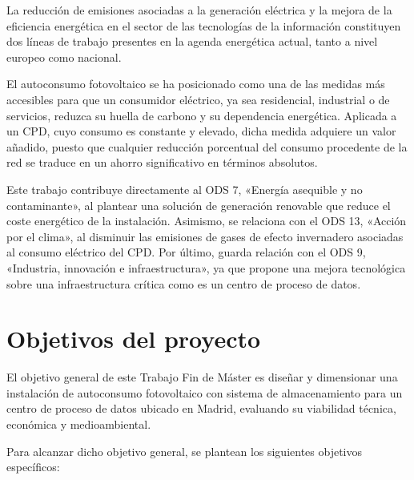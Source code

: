 La reducción de emisiones asociadas a la generación eléctrica y la mejora de la eficiencia energética en el sector de las tecnologías de la información constituyen dos líneas de trabajo presentes en la agenda energética actual, tanto a nivel europeo como nacional.

El autoconsumo fotovoltaico se ha posicionado como una de las medidas más accesibles para que un consumidor eléctrico, ya sea residencial, industrial o de servicios, reduzca su huella de carbono y su dependencia energética. Aplicada a un \ac{CPD}, cuyo consumo es constante y elevado, dicha medida adquiere un valor añadido, puesto que cualquier reducción porcentual del consumo procedente de la red se traduce en un ahorro significativo en términos absolutos.

Este trabajo contribuye directamente al \ac{ODS} 7, «Energía asequible y no contaminante», al plantear una solución de generación renovable que reduce el coste energético de la instalación. Asimismo, se relaciona con el \ac{ODS} 13, «Acción por el clima», al disminuir las emisiones de gases de efecto invernadero asociadas al consumo eléctrico del \ac{CPD}. Por último, guarda relación con el \ac{ODS} 9, «Industria, innovación e infraestructura», ya que propone una mejora tecnológica sobre una infraestructura crítica como es un centro de proceso de datos.

\section{Objetivos del proyecto}
\label{sec:intro-objetivos}

El objetivo general de este Trabajo Fin de Máster es diseñar y dimensionar una instalación de autoconsumo fotovoltaico con sistema de almacenamiento para un centro de proceso de datos ubicado en Madrid, evaluando su viabilidad técnica, económica y medioambiental.

Para alcanzar dicho objetivo general, se plantean los siguientes objetivos específicos:

